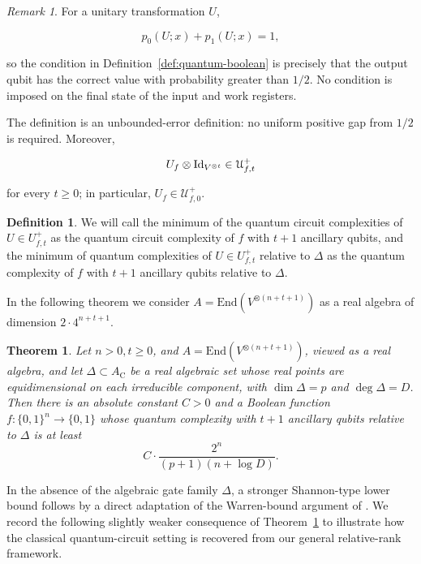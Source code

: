\documentclass[10pt]{amsart}
\newtheorem{theorem}{Theorem}
\theoremstyle{definition}
\newtheorem{definition}{Definition}[section]
\theoremstyle{remark}
\newtheorem{remark}{Remark}
\numberwithin{equation}{section}
\newcommand {\C}     {\mathrm{C}}
\newcommand {\Id} {\mbox{\rm Id}}
\newcommand{\End}{\mathrm{End}}
\begin{document}
\begin{remark}
For a unitary transformation \(U\),

$$
p_0(U;x)+p_1(U;x)=1,
$$

so the condition in Definition~\ref{def:quantum-boolean} is precisely
that the output qubit has the correct value with probability greater than
\(1/2\). No condition is imposed on the final state of the input and work
registers.

The definition is an unbounded-error definition: no uniform positive gap
from \(1/2\) is required. Moreover,

$$
U_f\otimes \Id_{V^{\otimes t}}\in\mathcal U^{+}_{f,t}
$$

for every \(t\geq 0\); in particular, \(U_f\in\mathcal U^{+}_{f,0}\).
\end{remark}



\begin{definition}
\label{def:quantum-complexity-Boolean-relaxed}
We will call the 
minimum of the 
quantum circuit complexities of $U \in U_{f,t}^+$
as the quantum circuit complexity of $f$ with $t+1$ ancillary qubits, 
and the 
minimum of 
quantum complexities of $U \in U_{f,t}^+$ relative to $\Delta$ as
the quantum complexity of $f$ with $t+1$ ancillary qubits relative to $\Delta$.
\end{definition}


In the following theorem we consider $A = \End(V^{\otimes (n+t+1)})$ as
a real algebra of dimension $2\cdot 4^{n+t+1}$.



\begin{theorem}
\label{thm:quantum2}
\label{cor:15}
Let $n>0, t \geq 0$, and  $A=\End(V^{\otimes(n+t+1)})$, viewed as a real algebra, and let $\Delta\subset A_\C$ be a real algebraic set whose real points are equidimensional on each irreducible component, with $\dim\Delta=p$ and $\deg\Delta=D$. Then there is an absolute constant $C>0$ and a Boolean function $f:\{0,1\}^n\to\{0,1\}$ whose quantum complexity with $t+1$ ancillary qubits relative to $\Delta$ is at least
\[
C\cdot\frac{2^n}{(p+1)(n+\log D)}.
\]
\end{theorem}



In the absence of the algebraic gate family \(\Delta\), a stronger Shannon-type lower bound follows by a direct adaptation of the Warren-bound argument of \cite[Theorem 7.1]{Roychowdhury-et-al}. We record the following slightly weaker consequence of Theorem~\ref{thm:quantum2} to illustrate how the classical quantum-circuit setting is recovered from our general relative-rank framework.
\end{document}
